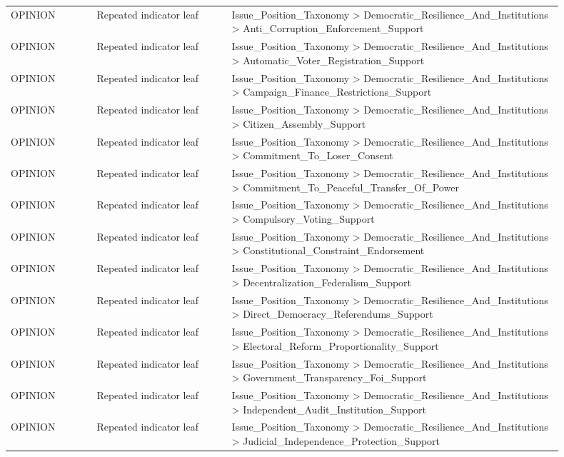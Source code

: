 \begin{table}[htbp]
\begin{threeparttable}
\begin{tabular}{p{0.14\linewidth}p{0.22\linewidth}p{0.54\linewidth}}
OPINION & Repeated indicator leaf & Issue\_Position\_Taxonomy > Democratic\_Resilience\_And\_Institutions > Anti\_Corruption\_Enforcement\_Support \\
OPINION & Repeated indicator leaf & Issue\_Position\_Taxonomy > Democratic\_Resilience\_And\_Institutions > Automatic\_Voter\_Registration\_Support \\
OPINION & Repeated indicator leaf & Issue\_Position\_Taxonomy > Democratic\_Resilience\_And\_Institutions > Campaign\_Finance\_Restrictions\_Support \\
OPINION & Repeated indicator leaf & Issue\_Position\_Taxonomy > Democratic\_Resilience\_And\_Institutions > Citizen\_Assembly\_Support \\
OPINION & Repeated indicator leaf & Issue\_Position\_Taxonomy > Democratic\_Resilience\_And\_Institutions > Commitment\_To\_Loser\_Consent \\
OPINION & Repeated indicator leaf & Issue\_Position\_Taxonomy > Democratic\_Resilience\_And\_Institutions > Commitment\_To\_Peaceful\_Transfer\_Of\_Power \\
OPINION & Repeated indicator leaf & Issue\_Position\_Taxonomy > Democratic\_Resilience\_And\_Institutions > Compulsory\_Voting\_Support \\
OPINION & Repeated indicator leaf & Issue\_Position\_Taxonomy > Democratic\_Resilience\_And\_Institutions > Constitutional\_Constraint\_Endorsement \\
OPINION & Repeated indicator leaf & Issue\_Position\_Taxonomy > Democratic\_Resilience\_And\_Institutions > Decentralization\_Federalism\_Support \\
OPINION & Repeated indicator leaf & Issue\_Position\_Taxonomy > Democratic\_Resilience\_And\_Institutions > Direct\_Democracy\_Referendums\_Support \\
OPINION & Repeated indicator leaf & Issue\_Position\_Taxonomy > Democratic\_Resilience\_And\_Institutions > Electoral\_Reform\_Proportionality\_Support \\
OPINION & Repeated indicator leaf & Issue\_Position\_Taxonomy > Democratic\_Resilience\_And\_Institutions > Government\_Transparency\_Foi\_Support \\
OPINION & Repeated indicator leaf & Issue\_Position\_Taxonomy > Democratic\_Resilience\_And\_Institutions > Independent\_Audit\_Institution\_Support \\
OPINION & Repeated indicator leaf & Issue\_Position\_Taxonomy > Democratic\_Resilience\_And\_Institutions > Judicial\_Independence\_Protection\_Support \\

\end{tabular}
\end{threeparttable}
\end{table}
